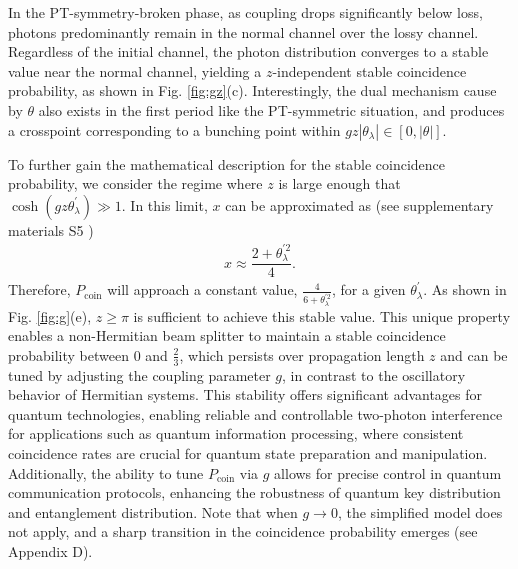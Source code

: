 \documentclass[%
reprint,
superscriptaddress,
amsthm,amsmath,amssymb,
aps,
]{revtex4-1}
\begin{document}
In the PT-symmetry-broken phase, as coupling drops significantly below loss, photons predominantly remain in the normal channel over the lossy channel. Regardless of the initial channel, the photon distribution converges to a stable value near the normal channel, yielding a $z$-independent stable coincidence probability, as shown in Fig. \ref{fig:gz}(c). Interestingly, the dual mechanism cause by $\theta$ also exists in the first period like the PT-symmetric situation, and produces a crosspoint corresponding to a bunching point within $gz|\theta_{\lambda}|\in[0, |\theta|]$.

To further gain the mathematical description for the stable coincidence probability, we consider the regime where $z$ is large enough that $\cosh(gz\theta^{'}_{\lambda})\gg1$. In this limit, $x$ can be approximated as (see supplementary materials S5 \cite{SupplementalMaterial})
\begin{eqnarray}
	x\approx\dfrac{2+ \theta_{\lambda }^{'2} }{4} \label{16}.
\end{eqnarray}
Therefore, $P_{\text{coin}}$ will approach a constant value, $ \frac{4}{6+ \theta_{\lambda }^{'2}}$, for a given $\theta_{\lambda }^{'} $. As shown in Fig. \ref{fig:g}(e), $z\geq\pi$ is sufficient to achieve this stable value. This unique property enables a non-Hermitian beam splitter to maintain a stable coincidence probability between 0 and $\frac{2}{3}$, which persists over propagation length $z$ and can be tuned by adjusting the coupling parameter $g$, in contrast to the oscillatory behavior of Hermitian systems. This stability offers significant advantages for quantum technologies, enabling reliable and controllable two-photon interference for applications such as quantum information processing, where consistent coincidence rates are crucial for quantum state preparation and manipulation. Additionally, the ability to tune $P_{\text{coin}}$ via $g$ allows for precise control in quantum communication protocols, enhancing the robustness of quantum key distribution and entanglement distribution. Note that when $g\rightarrow0$, the simplified model does not apply, and a sharp transition in the coincidence probability emerges (see Appendix D).
 \\
\hfill
\end{document}
